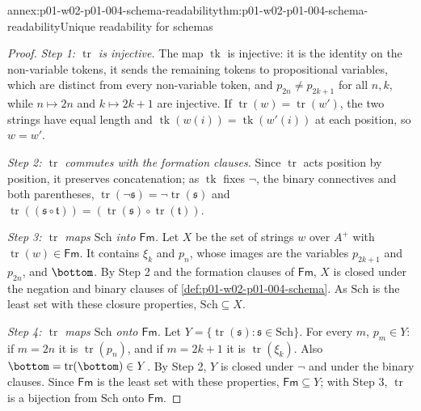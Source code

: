 \begin{annexitem}{annex:p01-w02-p01-004-schema-readability}{thm:p01-w02-p01-004-schema-readability}{Unique readability for schemas}
\begin{proof}
\emph{Step 1: \(\operatorname{tr}\) is injective.} The map \(\operatorname{tk}\) is
injective: it is the identity on the non-variable tokens, it sends the
remaining tokens to propositional variables, which are distinct from every
non-variable token, and \(p_{2n}\ne p_{2k+1}\) for all \(n,k\), while
\(n\mapsto 2n\) and \(k\mapsto 2k+1\) are injective. If
\(\operatorname{tr}(w)=\operatorname{tr}(w')\), the two strings have equal
length and \(\operatorname{tk}(w(i))=\operatorname{tk}(w'(i))\) at each position, so \(w=w'\).

\emph{Step 2: \(\operatorname{tr}\) commutes with the formation clauses.}
Since \(\operatorname{tr}\) acts position by position, it preserves
concatenation; as \(\operatorname{tk}\) fixes \(\neg\), the binary connectives and both
parentheses, \(\operatorname{tr}(\neg\mathfrak s)=\neg\operatorname{tr}(\mathfrak
s)\) and \(\operatorname{tr}((\mathfrak s\circ\mathfrak t))=
(\operatorname{tr}(\mathfrak s)\circ\operatorname{tr}(\mathfrak t))\).

\emph{Step 3: \(\operatorname{tr}\) maps \(\mathrm{Sch}\) into \(\mathsf{Fm}\).}
Let \(X\) be the set of strings \(w\) over \(A^{+}\) with
\(\operatorname{tr}(w)\in\mathsf{Fm}\). It contains \(\xi_k\) and \(p_n\),
whose images are the variables \(p_{2k+1}\) and \(p_{2n}\), and \(\bottom\).
By Step 2 and the formation clauses of \(\mathsf{Fm}\), \(X\) is closed under
the negation and binary clauses of \cref{def:p01-w02-p01-004-schema}. As
\(\mathrm{Sch}\) is the least set with these closure properties,
\(\mathrm{Sch}\subseteq X\).

\emph{Step 4: \(\operatorname{tr}\) maps \(\mathrm{Sch}\) onto \(\mathsf{Fm}\).}
Let \(Y=\{\operatorname{tr}(\mathfrak s):\mathfrak s\in\mathrm{Sch}\}\). For
every \(m\), \(p_m\in Y\): if \(m=2n\) it is \(\operatorname{tr}(p_n)\), and if
\(m=2k+1\) it is \(\operatorname{tr}(\xi_k)\). Also
\(\bottom=\operatorname{tr}(\bottom)\in Y\). By Step 2, \(Y\) is closed under
\(\neg\) and under the binary clauses. Since \(\mathsf{Fm}\) is the least set
with these properties, \(\mathsf{Fm}\subseteq Y\); with Step 3,
\(\operatorname{tr}\) is a bijection from \(\mathrm{Sch}\) onto \(\mathsf{Fm}\).


\end{proof}
\end{annexitem}
